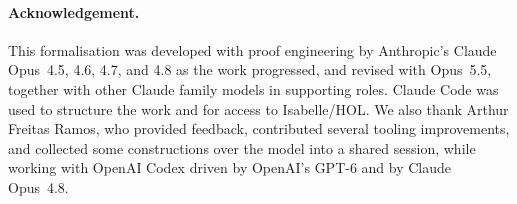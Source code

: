\paragraph*{Acknowledgement.}
This formalisation was developed with proof engineering by
Anthropic's Claude Opus~4.5, 4.6, 4.7, and 4.8 as the work progressed,
and revised with Opus~5.5, together with other Claude family models in
supporting roles.
Claude Code was used to structure the work and for access to Isabelle/HOL.
We also thank Arthur Freitas Ramos, who provided feedback, contributed
several tooling improvements, and collected some constructions over
the model into a shared session, while working with OpenAI Codex
driven by OpenAI's GPT-6 and by Claude Opus~4.8.
